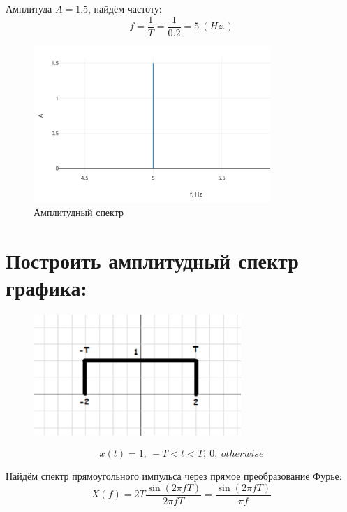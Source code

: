 \documentclass{article}
\begin{document}
Амплитуда $A = 1.5$, найдём частоту:
\begin{equation*}
    f = \frac{1}{T} = \frac{1}{0.2} = 5\:(Hz.)
\end{equation*}
\begin{figure}[h]
    \centering
    \includegraphics[width=0.8\textwidth]{plot3.png}
    \caption{Амплитудный спектр}
\end{figure}

\newpage
\section{Построить амплитудный спектр графика:}
\begin{figure}[h]
    \centering
    \includegraphics[width=0.7\textwidth]{task4.png}
\end{figure}

\begin{equation}
    x(t) = 1,\:-T < t < T;\:0,\:otherwise
\end{equation}

Найдём спектр прямоугольного импульса через прямое преобразование Фурье:
\begin{equation*}
    X(f) = 2T\frac{\sin(2\pi f T)}{2\pi f T} = \frac{\sin(2\pi f T)}{\pi f}
\end{equation*}
\end{document}

